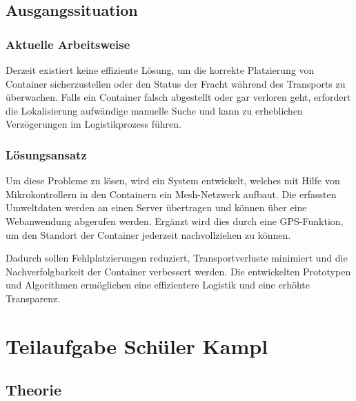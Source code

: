 \documentclass[
    headings=optiontotocandhead,%
    twoside,
    numbers=noenddot,%
    12pt, %
    titlepage, %
    parskip=full, %
    listof=leveldown, 
    numbers=noenddot, %
    a4paper,DIV=14,
    BCOR=15mm,
]{scrbook}
\makeatletter
\newcommand*{\authormark}{}
\newcommand*{\textauthor}[1]{%
   \renewcommand{\authormark}{\translate{author}: #1}%
   \ignorespaces
}
\newcommand*{\the@orig@section}{}
\let\the@orig@section\section
\renewcommand*{\section}{%
  \clearpage
  \the@orig@section
}
\makeatother
\begin{document}
\hypertarget{ausgangssituation}{%
\subsection{Ausgangssituation}\label{ausgangssituation}}

\hypertarget{aktuelle-arbeitsweise}{%
\subsubsection{Aktuelle Arbeitsweise}\label{aktuelle-arbeitsweise}}

Derzeit existiert keine effiziente Lösung, um die korrekte Platzierung
von Container sicherzustellen oder den Status der Fracht während des
Transports zu überwachen. Falls ein Container falsch abgestellt oder gar
verloren geht, erfordert die Lokalisierung aufwändige manuelle Suche und
kann zu erheblichen Verzögerungen im Logistikprozess führen.

\hypertarget{luxf6sungsansatz}{%
\subsubsection{Lösungsansatz}\label{luxf6sungsansatz}}

Um diese Probleme zu lösen, wird ein System entwickelt, welches mit
Hilfe von Mikrokontrollern in den Containern ein Mesh-Netzwerk aufbaut.
Die erfassten Umweltdaten werden an einen Server übertragen und können
über eine Webanwendung abgerufen werden. Ergänzt wird dies durch eine
GPS-Funktion, um den Standort der Container jederzeit nachvollziehen zu
können.

Dadurch sollen Fehlplatzierungen reduziert, Transportverluste minimiert
und die Nachverfolgbarkeit der Container verbessert werden. Die
entwickelten Prototypen und Algorithmen ermöglichen eine effizientere
Logistik und eine erhöhte Transparenz.

\hypertarget{teilaufgabe-schuxfcler-kampl}{%
\section{Teilaufgabe Schüler Kampl}\label{teilaufgabe-schuxfcler-kampl}}

\textauthor{Maximilian Silvester Kampl}

\hypertarget{theorie}{%
\subsection{Theorie}\label{theorie}}
\end{document}
